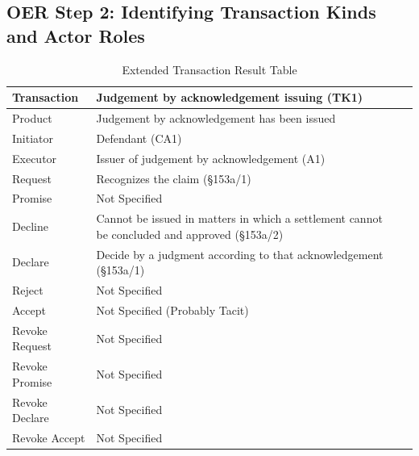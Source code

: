 \begin{landscape}
\section{OER Step 2: Identifying Transaction Kinds and Actor Roles}

\begin{table}[h]
\caption{Extended Transaction Result Table}
\label{tab:etrt}
\begin{tabular}{|l||l|l|}
\hline
Transaction  & Judgement by acknowledgement issuing (TK1) \\ \hline
Product      & Judgement by acknowledgement has been issued   \\ \hline
Initiator      & Defendant (CA1) \\ \hline
Executor       & Issuer of judgement by acknowledgement (A1)      \\ \hline
Request        & Recognizes the claim (\S153a/1)   \\ \hline
Promise        & Not Specified   \\ \hline
Decline        &  Cannot be issued in matters in which a settlement cannot be concluded and approved  (\S153a/2)  \\ \hline
Declare        & Decide by a judgment according to that acknowledgement (\S153a/1)  \\ \hline
Reject         &  Not Specified   \\ \hline
Accept         & Not Specified (Probably Tacit) \\ \hline
Revoke Request & Not Specified \\ \hline
Revoke Promise & Not Specified \\ \hline
Revoke Declare & Not Specified  \\ \hline
Revoke Accept  &  Not Specified   \\ \hline
\end{tabular}
\end{table}


\end{landscape}
